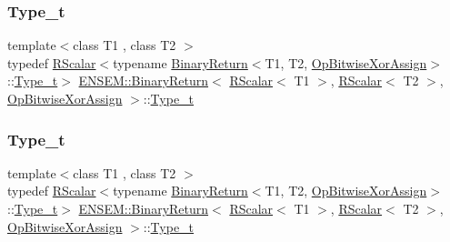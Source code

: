\subsubsection{\texorpdfstring{Type\_t}{Type\_t}\hspace{0.1cm}{\footnotesize\ttfamily [2/3]}}
{\footnotesize\ttfamily template$<$class T1 , class T2 $>$ \\
typedef \mbox{\hyperlink{classENSEM_1_1RScalar}{R\+Scalar}}$<$typename \mbox{\hyperlink{structENSEM_1_1BinaryReturn}{Binary\+Return}}$<$T1, T2, \mbox{\hyperlink{structENSEM_1_1OpBitwiseXorAssign}{Op\+Bitwise\+Xor\+Assign}}$>$\+::\mbox{\hyperlink{structENSEM_1_1BinaryReturn_3_01RScalar_3_01T1_01_4_00_01RScalar_3_01T2_01_4_00_01OpBitwiseXorAssign_01_4_aa6f274b3036467e06b0e918d36ce0151}{Type\+\_\+t}}$>$ \mbox{\hyperlink{structENSEM_1_1BinaryReturn}{E\+N\+S\+E\+M\+::\+Binary\+Return}}$<$ \mbox{\hyperlink{classENSEM_1_1RScalar}{R\+Scalar}}$<$ T1 $>$, \mbox{\hyperlink{classENSEM_1_1RScalar}{R\+Scalar}}$<$ T2 $>$, \mbox{\hyperlink{structENSEM_1_1OpBitwiseXorAssign}{Op\+Bitwise\+Xor\+Assign}} $>$\+::\mbox{\hyperlink{structENSEM_1_1BinaryReturn_3_01RScalar_3_01T1_01_4_00_01RScalar_3_01T2_01_4_00_01OpBitwiseXorAssign_01_4_aa6f274b3036467e06b0e918d36ce0151}{Type\+\_\+t}}}

\mbox{\label{structENSEM_1_1BinaryReturn_3_01RScalar_3_01T1_01_4_00_01RScalar_3_01T2_01_4_00_01OpBitwiseXorAssign_01_4_aa6f274b3036467e06b0e918d36ce0151}} 
\subsubsection{\texorpdfstring{Type\_t}{Type\_t}\hspace{0.1cm}{\footnotesize\ttfamily [3/3]}}
{\footnotesize\ttfamily template$<$class T1 , class T2 $>$ \\
typedef \mbox{\hyperlink{classENSEM_1_1RScalar}{R\+Scalar}}$<$typename \mbox{\hyperlink{structENSEM_1_1BinaryReturn}{Binary\+Return}}$<$T1, T2, \mbox{\hyperlink{structENSEM_1_1OpBitwiseXorAssign}{Op\+Bitwise\+Xor\+Assign}}$>$\+::\mbox{\hyperlink{structENSEM_1_1BinaryReturn_3_01RScalar_3_01T1_01_4_00_01RScalar_3_01T2_01_4_00_01OpBitwiseXorAssign_01_4_aa6f274b3036467e06b0e918d36ce0151}{Type\+\_\+t}}$>$ \mbox{\hyperlink{structENSEM_1_1BinaryReturn}{E\+N\+S\+E\+M\+::\+Binary\+Return}}$<$ \mbox{\hyperlink{classENSEM_1_1RScalar}{R\+Scalar}}$<$ T1 $>$, \mbox{\hyperlink{classENSEM_1_1RScalar}{R\+Scalar}}$<$ T2 $>$, \mbox{\hyperlink{structENSEM_1_1OpBitwiseXorAssign}{Op\+Bitwise\+Xor\+Assign}} $>$\+::\mbox{\hyperlink{structENSEM_1_1BinaryReturn_3_01RScalar_3_01T1_01_4_00_01RScalar_3_01T2_01_4_00_01OpBitwiseXorAssign_01_4_aa6f274b3036467e06b0e918d36ce0151}{Type\+\_\+t}}}



